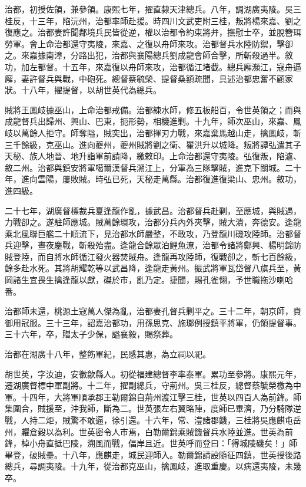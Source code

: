 \begin{pinyinscope}
治都，初授佐領，兼參領。康熙七年，擢直隸天津總兵。八年，調湖廣夷陵。吳三桂反，十三年，陷沅州，治都率師赴援。時四川文武吏附三桂，叛將楊來嘉、劉之復應之。治都妻許聞鄰境兵民皆從逆，權以治都令約束將弁，撫慰士卒，並脫簪珥勞軍。會上命治都還守夷陵，來嘉、之復以舟師來攻。治都督兵水陸防禦，擊卻之。來嘉據南漳，分路出犯，治都與襄陽總兵劉成龍會師合擊，所斬殺過半。敘功，加左都督。十五年，來嘉復以舟師來攻，治都循江堵截。總兵廨瀕江，寇舟逼廨，妻許督兵與戰，中砲死。總督蔡毓榮、提督桑額疏聞，具述治都忠奮不顧家狀。十八年，擢提督，以胡世英代為總兵。

賊將王鳳岐據巫山，上命治都戒備。治都練水師，修五板船百，令世英領之；而與成龍督兵出歸州、興山、巴東，扼形勢，相機進剿。十九年，師次巫山，來嘉、鳳岐以萬餘人拒守。師奪隘，賊突出，治都揮刃力戰，來嘉棄馬越山走，擒鳳岐，斬三千餘級，克巫山。進向夔州，夔州賊將劉之衛、瞿洪升以城降。叛將譚弘遣其子天秘、族人地晉、地升詣軍前請降，繳敕印。上命治都還守夷陵。弘復叛，陷瀘、敘二州。治都與鎮安將軍噶爾漢督兵溯江上，分軍為三隊擊賊，進克下關城。二十年，進向雲陽，屢敗賊。時弘已死，天秘走萬縣。治都復進復梁山、忠州。敘功，進四級。

二十七年，湖廣督標裁兵夏逢龍作亂，據武昌。治都督兵赴剿，至應城，與賊遇，力戰卻之。遂駐師應城。賊萬餘環攻，治都分兵內外夾擊，賊大潰，奔德安。逢龍乘北風聯巨艦二十順流下，見治都水師嚴整，不敢攻，乃登龍川磯攻陸師。治都督兵迎擊，晝夜鏖戰，斬殺殆盡。逢龍合餘眾泊鯉魚潦，治都令諸將鄭興、楊明錦防賊登陸，而自將水師循江發火器焚賊舟。逢龍再攻陸師，復戰卻之，斬七百餘級，餘多赴水死。其將胡耀乾等以武昌降，逢龍走黃州。振武將軍瓦岱督八旗兵至，黃岡諸生宜畏生擒逢龍以獻，磔於市，亂乃定。捷聞，賜孔雀翎，予世職拖沙喇哈番。

治都師未還，桃源土寇萬人傑為亂，治都妻孔督兵剿平之。三十二年，朝京師，賚御用冠服。三十三年，詔嘉治都功，用孫思克、施瑯例授鎮平將軍，仍領提督事。三十六年，卒，贈太子少保，謚襄毅，賜祭葬。

治都在湖廣十八年，整飭軍紀，民感其惠，為立祠以祀。

胡世英，字汝迪，安徽歙縣人。初從福建總督李率泰軍。累功至參將。康熙元年，遷湖廣督標中軍副將。十二年，擢副總兵，守荊州。吳三桂反，總督蔡毓榮檄為中軍。十四年，大將軍順承郡王勒爾錦自荊州渡江擊三桂，世英以四百人為前鋒。師集圍合，賊援至，沖我師，斷為二。世英張左右翼略陣，度師已畢濟，乃分騎隊逆戰，人持二炬，賊驚不敢逼，徐引還。十六年，常、澧諸郡饑，三桂將吳應麒屯岳州，糶倉穀以為利。世英密令人市焉，白勒爾錦乘賊饑督兵水陸並進。世英為前鋒，棹小舟直抵巴陵，溯風而戰，偪岸且近。世英呼而登曰：「得城陵磯矣！」師畢登，破賊壘。十八年，應麒走，城民迎師入。勒爾錦請設隨征四鎮，世英授後路總兵，尋調夷陵。十九年，從治都克巫山，擒鳳岐，進取重慶。以病還夷陵，未幾卒。


\end{pinyinscope}
